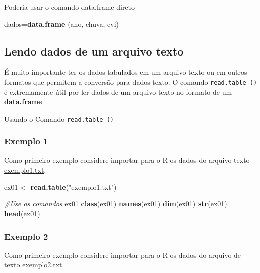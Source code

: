 \documentclass[]{book}
\newenvironment{Shaded}{\begin{snugshade}}{\end{snugshade}}
\newcommand{\CommentTok}[1]{\textcolor[rgb]{0.56,0.35,0.01}{\textit{#1}}}
\newcommand{\KeywordTok}[1]{\textcolor[rgb]{0.13,0.29,0.53}{\textbf{#1}}}
\newcommand{\NormalTok}[1]{#1}
\newcommand{\StringTok}[1]{\textcolor[rgb]{0.31,0.60,0.02}{#1}}
\begin{document}
Poderia usar o comando data.frame direto

\begin{Shaded}
\begin{Highlighting}[]
\NormalTok{dados=}\KeywordTok{data.frame}\NormalTok{ (ano, chuva, evi)}
\end{Highlighting}
\end{Shaded}

\hypertarget{lendo-dados-de-um-arquivo-texto}{%
\subsection{Lendo dados de um arquivo texto}\label{lendo-dados-de-um-arquivo-texto}}

É muito importante ter os dados tabulados em um arquivo-texto ou em outros formatos que permitem a conversão para dados texto. O comando \texttt{read.table\ ()} é extremamente útil por ler dados de um arquivo-texto no formato de um \textbf{data.frame}

Usando o Comando \texttt{read.table\ ()}

\hypertarget{exemplo-1-1}{%
\subsubsection{Exemplo 1}\label{exemplo-1-1}}

Como primeiro exemplo considere importar para o R os dados do arquivo texto \href{https://www.dropbox.com/s/m7jivbbggei5y0x/exemplo1.txt?dl=1}{exemplo1.txt}.

\begin{Shaded}
\begin{Highlighting}[]
\NormalTok{ex01 <-}\StringTok{ }\KeywordTok{read.table}\NormalTok{(}\StringTok{"exemplo1.txt"}\NormalTok{) }

\CommentTok{#Use os comandos}
\NormalTok{  ex01}
  \KeywordTok{class}\NormalTok{(ex01)}
  \KeywordTok{names}\NormalTok{(ex01)}
  \KeywordTok{dim}\NormalTok{(ex01)}
  \KeywordTok{str}\NormalTok{(ex01)}
  \KeywordTok{head}\NormalTok{(ex01)}
\end{Highlighting}
\end{Shaded}

\hypertarget{exemplo-2-1}{%
\subsubsection{Exemplo 2}\label{exemplo-2-1}}

Como primeiro exemplo considere importar para o R os dados do arquivo de texto \href{https://www.dropbox.com/s/bi4b0j2nnnetc1r/exemplo2.txt?dl=1}{exemplo2.txt}.
\end{document}
